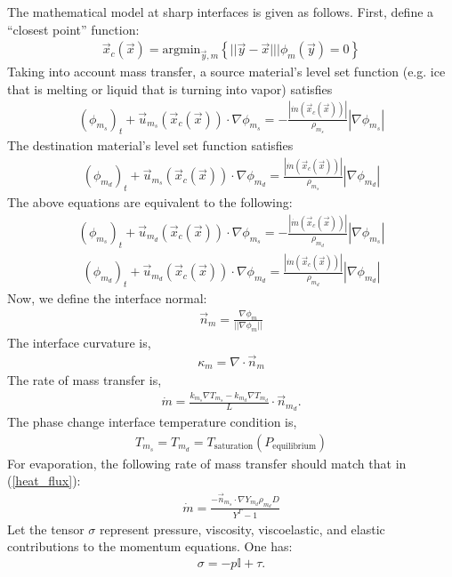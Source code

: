 \documentclass[]{article}
\newcommand{\EyeTen}{\mathbb{I}}
\begin{document}
The mathematical model at sharp interfaces is given as follows.  First,
define a ``closest point'' function:
\begin{eqnarray}
	\vec{x}_{c}(\vec{x})=\mbox{argmin}_{\vec{y},m}
	\left\{ ||\vec{y}-\vec{x}|| | \phi_{m}(\vec{y})=0 \right\}
\end{eqnarray}
Taking into account mass transfer, a source material's level set function
(e.g. ice that is melting or liquid that is turning into vapor) satisfies
\begin{eqnarray}
	(\phi_{m_{s}})_{t}+\vec{u}_{m_{s}}(\vec{x}_{c}(\vec{x}))\cdot
	\nabla\phi_{m_{s}}=
	-\frac{|\dot{m}(\vec{x}_{c}(\vec{x}))|}{\rho_{m_{s}}}
	|\nabla\phi_{m_{s}}|
\end{eqnarray} 
The destination material's level set function satisfies
\begin{eqnarray}
	(\phi_{m_{d}})_{t}+\vec{u}_{m_{s}}(\vec{x}_{c}(\vec{x}))\cdot
	\nabla\phi_{m_{d}}=
	\frac{|\dot{m}(\vec{x}_{c}(\vec{x}))|}{\rho_{m_{s}}}
	|\nabla\phi_{m_{d}}|
\end{eqnarray} 
The above equations are equivalent to the following:
\begin{eqnarray}
	(\phi_{m_{s}})_{t}+\vec{u}_{m_{d}}(\vec{x}_{c}(\vec{x}))\cdot
	\nabla\phi_{m_{s}}=
	-\frac{|\dot{m}(\vec{x}_{c}(\vec{x}))|}{\rho_{m_{d}}}
	|\nabla\phi_{m_{s}}|
\end{eqnarray} 
\begin{eqnarray}
	(\phi_{m_{d}})_{t}+\vec{u}_{m_{d}}(\vec{x}_{c}(\vec{x}))\cdot
	\nabla\phi_{m_{d}}=
	\frac{|\dot{m}(\vec{x}_{c}(\vec{x}))|}{\rho_{m_{d}}}
	|\nabla\phi_{m_{d}}|
\end{eqnarray} 
Now, we define the interface normal:
\begin{eqnarray}
	\vec{n}_{m}=\frac{\nabla\phi_{m}}{||\nabla\phi_{m}||}
\end{eqnarray}
The interface curvature is,
\begin{eqnarray}
	\kappa_{m}=\nabla\cdot\vec{n}_{m}
\end{eqnarray}
The rate of mass transfer is,
\begin{eqnarray}
	\dot{m}=\frac{
		k_{m_{s}}\nabla T_{m_{s}}-
		k_{m_{d}}\nabla T_{m_{d}}}{L}\cdot \vec{n}_{m_{d}}.
	\label{heat_flux}
\end{eqnarray}
The phase change interface temperature condition is,
\begin{eqnarray}
	T_{m_{s}}=T_{m_{d}}=
	T_{\mbox{saturation}}(P_{\mbox{equilibrium}})
\end{eqnarray}
For evaporation, the following rate of mass transfer should match that in
(\ref{heat_flux}):
\begin{eqnarray}
	\dot{m}=\frac{-\vec{n}_{m_{s}}\cdot\nabla Y_{m_{d}}\rho_{m_{d}}D}
	{Y^{\Gamma}-1}
\end{eqnarray}
Let the tensor $\sigma$ represent pressure, viscosity, viscoelastic, and
elastic contributions to the momentum equations.  One has:
\begin{eqnarray}
	\sigma=-p\EyeTen+\tau.
\end{eqnarray}
\end{document}
